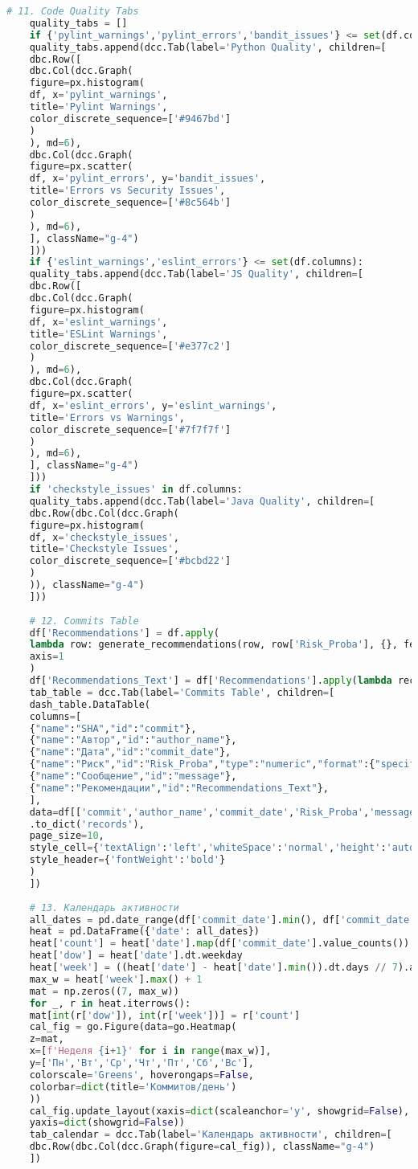 \begin{lstlisting}[language=Python, caption={{ \texttt{app.py}}}]
	# 11. Code Quality Tabs
	quality_tabs = []
	if {'pylint_warnings','pylint_errors','bandit_issues'} <= set(df.columns):
	quality_tabs.append(dcc.Tab(label='Python Quality', children=[
	dbc.Row([
	dbc.Col(dcc.Graph(
	figure=px.histogram(
	df, x='pylint_warnings',
	title='Pylint Warnings',
	color_discrete_sequence=['#9467bd']
	)
	), md=6),
	dbc.Col(dcc.Graph(
	figure=px.scatter(
	df, x='pylint_errors', y='bandit_issues',
	title='Errors vs Security Issues',
	color_discrete_sequence=['#8c564b']
	)
	), md=6),
	], className="g-4")
	]))
	if {'eslint_warnings','eslint_errors'} <= set(df.columns):
	quality_tabs.append(dcc.Tab(label='JS Quality', children=[
	dbc.Row([
	dbc.Col(dcc.Graph(
	figure=px.histogram(
	df, x='eslint_warnings',
	title='ESLint Warnings',
	color_discrete_sequence=['#e377c2']
	)
	), md=6),
	dbc.Col(dcc.Graph(
	figure=px.scatter(
	df, x='eslint_errors', y='eslint_warnings',
	title='Errors vs Warnings',
	color_discrete_sequence=['#7f7f7f']
	)
	), md=6),
	], className="g-4")
	]))
	if 'checkstyle_issues' in df.columns:
	quality_tabs.append(dcc.Tab(label='Java Quality', children=[
	dbc.Row(dbc.Col(dcc.Graph(
	figure=px.histogram(
	df, x='checkstyle_issues',
	title='Checkstyle Issues',
	color_discrete_sequence=['#bcbd22']
	)
	)), className="g-4")
	]))
	
	# 12. Commits Table
	df['Recommendations'] = df.apply(
	lambda row: generate_recommendations(row, row['Risk_Proba'], {}, feat_imps),
	axis=1
	)
	df['Recommendations_Text'] = df['Recommendations'].apply(lambda recs: "; ".join(recs))
	tab_table = dcc.Tab(label='Commits Table', children=[
	dash_table.DataTable(
	columns=[
	{"name":"SHA","id":"commit"},
	{"name":"Автор","id":"author_name"},
	{"name":"Дата","id":"commit_date"},
	{"name":"Риск","id":"Risk_Proba","type":"numeric","format":{"specifier":".2f"}},
	{"name":"Сообщение","id":"message"},
	{"name":"Рекомендации","id":"Recommendations_Text"},
	],
	data=df[['commit','author_name','commit_date','Risk_Proba','message','Recommendations_Text']]
	.to_dict('records'),
	page_size=10,
	style_cell={'textAlign':'left','whiteSpace':'normal','height':'auto'},
	style_header={'fontWeight':'bold'}
	)
	])
	
	# 13. Календарь активности
	all_dates = pd.date_range(df['commit_date'].min(), df['commit_date'].max(), freq='D')
	heat = pd.DataFrame({'date': all_dates})
	heat['count'] = heat['date'].map(df['commit_date'].value_counts()).fillna(0)
	heat['dow'] = heat['date'].dt.weekday
	heat['week'] = ((heat['date'] - heat['date'].min()).dt.days // 7).astype(int)
	max_w = heat['week'].max() + 1
	mat = np.zeros((7, max_w))
	for _, r in heat.iterrows():
	mat[int(r['dow']), int(r['week'])] = r['count']
	cal_fig = go.Figure(data=go.Heatmap(
	z=mat,
	x=[f'Неделя {i+1}' for i in range(max_w)],
	y=['Пн','Вт','Ср','Чт','Пт','Сб','Вс'],
	colorscale='Greens', hoverongaps=False,
	colorbar=dict(title='Коммитов/день')
	))
	cal_fig.update_layout(xaxis=dict(scaleanchor='y', showgrid=False),
	yaxis=dict(showgrid=False))
	tab_calendar = dcc.Tab(label='Календарь активности', children=[
	dbc.Row(dbc.Col(dcc.Graph(figure=cal_fig)), className="g-4")
	])
	

\end{lstlisting}

